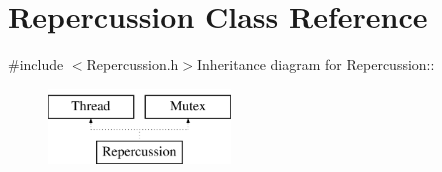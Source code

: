 \hypertarget{classRepercussion}{
\section{Repercussion Class Reference}
\label{classRepercussion}
}


{\ttfamily \#include $<$Repercussion.h$>$}Inheritance diagram for Repercussion::\begin{figure}[H]
\begin{center}
\leavevmode
\includegraphics[height=2cm]{classRepercussion}
\end{center}
\end{figure}
